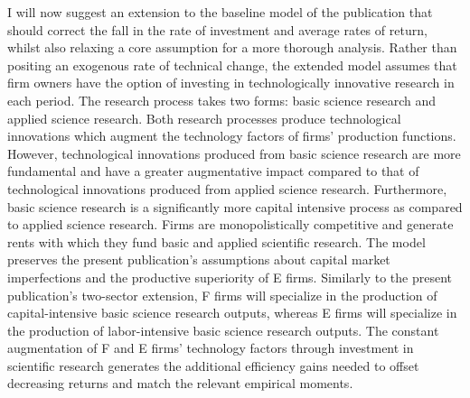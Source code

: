 \documentclass{article}
\begin{document}
I will now suggest an extension to the baseline model of the publication that should correct the fall in the rate 
of investment and average rates of return, whilst also relaxing a core assumption for a more thorough analysis.
Rather than positing an exogenous rate of technical change, the extended model assumes that firm owners have the option 
of investing in technologically innovative research in each period. The research process takes two forms: basic 
science research and applied science research. Both research processes produce technological innovations which 
augment the technology factors of firms' production functions. However, technological innovations produced from basic 
science research are more fundamental and have a greater augmentative impact compared to that of technological 
innovations produced from applied science research. Furthermore, basic science research is a significantly more 
capital intensive process as compared to applied science research. Firms are monopolistically competitive and 
generate rents with which they fund basic and applied scientific research. The model preserves the present publication's assumptions 
about capital market imperfections and the productive superiority of E firms. Similarly to the present publication's two-sector 
extension, F firms will specialize in the production of capital-intensive basic science research outputs, whereas E firms will specialize 
in the production of labor-intensive basic science research outputs. The constant augmentation of F and E firms' technology factors 
through investment in scientific research generates the additional efficiency gains needed to offset decreasing returns and 
match the relevant empirical moments. 
\end{document}
